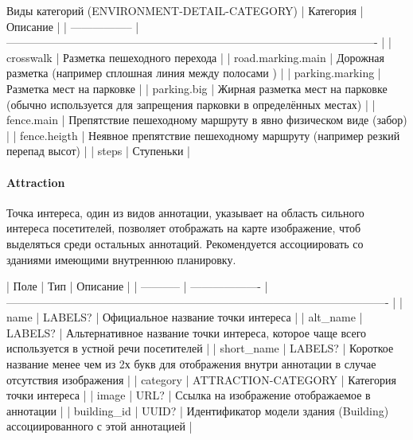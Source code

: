         Виды категорий (ENVIRONMENT-DETAIL-CATEGORY)
        | Категория         | Описание                                                                                             |
        | ----------------- | ---------------------------------------------------------------------------------------------------- |
        | crosswalk         | Разметка пешеходного перехода                                                                        |
        | road.marking.main | Дорожная разметка (например сплошная линия между полосами )                                          |
        | parking.marking   | Разметка мест на парковке                                                                            |
        | parking.big       | Жирная разметка мест на парковке (обычно используется для запрещения парковки в определённых местах) |
        | fence.main        | Препятствие пешеходному маршруту в явно физическом виде (забор)                                      |
        | fence.heigth      | Неявное препятствие пешеходному маршруту (например резкий перепад высот)                             |
        | steps             | Ступеньки                                                                                            |

      \paragraph{Attraction}
        Точка интереса, один из видов аннотации, указывает на область сильного интереса посетителей, позволяет отображать на карте изображение, чтоб выделяться среди остальных аннотаций. Рекомендуется ассоциировать со зданиями имеющими внутреннюю планировку.

        | Поле        | Тип                 | Описание                                                                                                |
        | ----------- | ------------------- | ------------------------------------------------------------------------------------------------------- |
        | name        | LABELS?             | Официальное название точки интереса                                                                     |
        | alt\_name    | LABELS?             | Альтернативное название точки интереса, которое чаще всего используется в устной речи посетителей       |
        | short\_name  | LABELS?             | Короткое название менее чем из 2х букв для отображения внутри аннотации в случае отсутствия изображения |
        | category    | ATTRACTION-CATEGORY | Категория точки интереса                                                                                |
        | image       | URL?                | Ссылка на изображение отображаемое в аннотации                                                          |
        | building\_id | UUID?               | Идентификатор модели здания (Building) ассоциированного с этой аннотацией                               |

